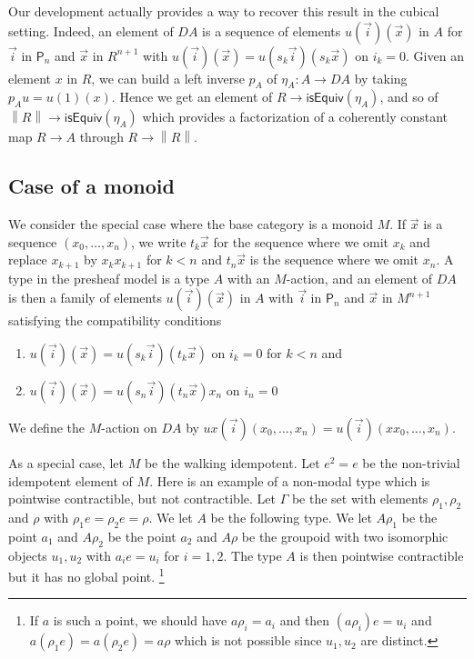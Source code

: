 \documentclass[10pt,a4paper,draft]{article}
\def\norm#1{\left\|#1\right\|}
\newcommand{\isEquiv}{\mathsf{isEquiv}}
\newcommand{\D}{D}              %
\renewcommand{\~}{\widetilde}
\newcommand{\PP}{\mathsf{P}}
\theoremstyle{definition}
\theoremstyle{remark} %
\begin{document}
Our development actually provides a way to recover
this result in the cubical setting.
Indeed, an element of $\D A$ is a sequence of elements $u(\vec{i})(\vec{x})$
in $A$ for $\vec{i}$ in $\PP_n$ and $\vec{x}$ in $R^{n+1}$ with
$u(\vec{i})(\vec{x}) = u(s_k\vec{i})(s_k\vec{x})$ on $i_k = 0$. Given an element
$x$ in $R$, we can build a left inverse $p_A$ of $\eta_A:A\rightarrow \D A$ by taking
$p_A u = u(1)(x)$. Hence we get an element of $R\rightarrow \isEquiv(\eta_A)$, and so of
$\norm{R}\rightarrow\isEquiv(\eta_A)$
which provides a factorization of a coherently constant map $R\rightarrow A$ through
$R\rightarrow\norm{R}$.

\subsection{Case of a monoid} \label{subsec:monoid}

 We consider the special case where the base category is a monoid $M$.
 If $\vec{x}$ is a sequence $(x_0,\dots,x_n)$,
 we write $t_k\vec{x}$ for the sequence where we omit $x_k$ and replace
 $x_{k+1}$ by $x_kx_{k+1}$ for $k<n$
 and $t_n\vec{x}$ is the sequence where we omit $x_n$. A type in the presheaf
 model is a type $A$ with an $M$\hyp{}action, and an element of $\D A$ is then
 a family of elements $u(\vec{i})(\vec{x})$ in $A$ with $\vec{i}$ in $\PP_n$
 and $\vec{x}$ in $M^{n+1}$ satisfying the compatibility conditions
 \begin{enumerate}
   \item $u(\vec{i})(\vec{x}) = u(s_k\vec{i})(t_k\vec{x})$ on $i_k = 0$ for $k<n$
     and
   \item $u(\vec{i})(\vec{x}) = u(s_n\vec{i})(t_n\vec{x})x_n$ on $i_n = 0$
     \end{enumerate}
 We define the $M$\hyp{}action on $\D A$ by
 $ux(\vec{i})(x_0,\dots,x_n) = u(\vec{i})(xx_0,\dots,x_n)$.

As a special case, let $M$ be the walking idempotent.
Let $e^2 = e$ be the non-trivial idempotent element of $M$.
Here is an example of a non\hyp{}modal type which is pointwise contractible, but not contractible.
Let $\Gamma$ be the set with elements $\rho_1,\rho_2$ and $\rho$ with
$\rho_1e = \rho_2 e = \rho$. We let $A$ be the following type.
We let $A\rho_1$ be the point $a_1$ and $A\rho_2$ be the point $a_2$
and $A\rho$ be the groupoid with two isomorphic objects $u_1,u_2$
with $a_ie = u_i$ for $i=1,2$. The type $A$ is then pointwise contractible
but it has no global point.%
\footnote{If $a$ is such a point, we should
have $a\rho_i = a_i$ and then $(a\rho_i) e = u_i$ and
$a(\rho_1e) = a(\rho_2e) = a\rho$ which is not possible since $u_1,u_2$
are distinct.}
\end{document}

